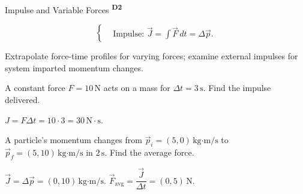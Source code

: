 ﻿\documentclass[12pt,a4paper]{article}
\providecommand{\KPFormulas}{}
\providecommand{\KPHeuristics}{}
\providecommand{\KPProblems}{}
\newcommand{\DTwo}{\texorpdfstring{\textsuperscript{\textbf{D2}}}{ D2}}
\begin{document}
\begin{KnowledgePoint}{Impulse and Variable Forces \DTwo}
  \KPFormulas
\begin{formulabox}
  \[
  \left\{\begin{aligned}
    &\text{Impulse: } \vec J=\int \vec F\,dt=\Delta \vec p.
  \end{aligned}\right.
  \]
\end{formulabox}

  \KPHeuristics
  \begin{heuristicsbox}
  Extrapolate force-time profiles for varying forces; examine external impulses for system imparted momentum changes.
  \end{heuristicsbox}

  \KPProblems
\begin{cheatproblem}
  A constant force $F=10\,\text{N}$ acts on a mass for $\Delta t=3\,\text{s}$. Find the impulse delivered.
\begin{solutionbox}
  $J=F\Delta t=10\cdot3=30\,\text{N}\cdot\text{s}$.
\end{solutionbox}
\end{cheatproblem}
\begin{cheatproblem}
  A particle's momentum changes from $\vec p_i=(5,0)\,\text{kg·m/s}$ to $\vec p_f=(5,10)\,\text{kg·m/s}$ in $2\,\text{s}$. Find the average force.
\begin{solutionbox}
  $\vec J=\Delta\vec p=(0,10)\,\text{kg·m/s}$. $\vec F_{\text{avg}}=\dfrac{\vec J}{\Delta t}=(0,5)\,\text{N}$.
\end{solutionbox}
\end{cheatproblem}
\end{KnowledgePoint}

\end{document}
